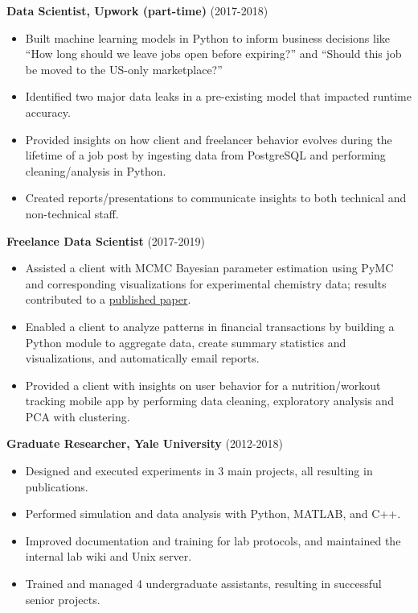 \documentclass[
]{report}
\providecommand{\tightlist}{%
  \setlength{\itemsep}{0pt}\setlength{\parskip}{0pt}}\usepackage{longtable,booktabs,array}
\begin{document}
\textbf{Data Scientist, Upwork (part-time)} (2017-2018)

\begin{itemize}
\tightlist
\item
  Built machine learning models in Python to inform business decisions
  like ``How long should we leave jobs open before expiring?'' and
  ``Should this job be moved to the US-only marketplace?''
\item
  Identified two major data leaks in a pre-existing model that impacted
  runtime accuracy.
\item
  Provided insights on how client and freelancer behavior evolves during
  the lifetime of a job post by ingesting data from PostgreSQL and
  performing cleaning/analysis in Python.
\item
  Created reports/presentations to communicate insights to both
  technical and non-technical staff.
\end{itemize}

\textbf{Freelance Data Scientist} (2017-2019)

\begin{itemize}
\tightlist
\item
  Assisted a client with MCMC Bayesian parameter estimation using PyMC
  and corresponding visualizations for experimental chemistry data;
  results contributed to a
  \href{https://pubs.acs.org/doi/abs/10.1021/acscatal.9b01234}{published
  paper}.
\item
  Enabled a client to analyze patterns in financial transactions by
  building a Python module to aggregate data, create summary statistics
  and visualizations, and automatically email reports.
\item
  Provided a client with insights on user behavior for a
  nutrition/workout tracking mobile app by performing data cleaning,
  exploratory analysis and PCA with clustering.
\end{itemize}

\textbf{Graduate Researcher, Yale University} (2012-2018)

\begin{itemize}
\tightlist
\item
  Designed and executed experiments in 3 main projects, all resulting in
  publications.
\item
  Performed simulation and data analysis with Python, MATLAB, and C++.
\item
  Improved documentation and training for lab protocols, and maintained
  the internal lab wiki and Unix server.
\item
  Trained and managed 4 undergraduate assistants, resulting in
  successful senior projects.
\end{itemize}
\end{document}
